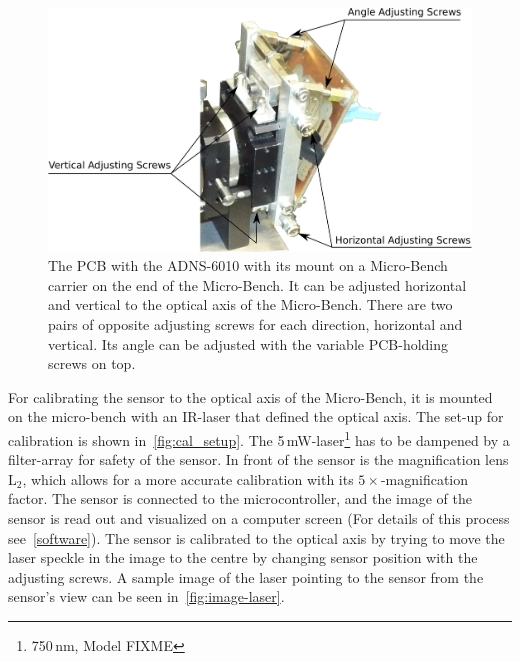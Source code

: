 \documentclass[12pt,a4paper]{article}
\begin{document}
\begin{figure}[htbp]
\begin{center}
\includegraphics[width=1\columnwidth]{figures/sens-mount.pdf}
\caption{\label{fig:sens-mount}
The PCB with the ADNS-6010 with its mount on a Micro-Bench carrier on the end of the Micro-Bench.
It can be adjusted horizontal and vertical to the optical axis of the Micro-Bench.
There are two pairs of opposite adjusting screws for each direction, horizontal and vertical.
Its angle can be adjusted with the variable PCB-holding screws on top.
}
\end{center}
\end{figure}

For calibrating the sensor to the optical axis of the Micro-Bench, it is mounted on the micro-bench with an IR-laser that defined the optical axis.
The set-up for calibration is shown in~\autoref{fig:cal_setup}.
The 5\,mW-laser\footnote{750\,nm, Model FIXME} has to be dampened by a filter-array for safety of the sensor.
In front of the sensor is the magnification lens L$_2$, which allows for a more accurate calibration with its $5\times$-magnification factor.
The sensor is connected to the microcontroller, and the image of the sensor is read out and visualized on a computer screen (For details of this process see~\autoref{software}).
The sensor is calibrated to the optical axis by trying to move the laser speckle in the image to the centre by changing sensor position with the adjusting screws.
A sample image of the laser pointing to the sensor from the sensor's view can be seen in~\autoref{fig:image-laser}.
\end{document}
